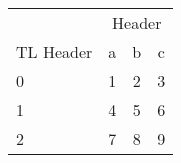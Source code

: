 \begin{table}
\centering
\begin{threeparttable}
\caption{}
\begin{tabular}{lccc}
\toprule
 & \multicolumn{3}{c}{Header}\\
\cmidrule(lr){2-4}
TL Header & a & b & c\\
\midrule
0 & 1 & 2 & 3 \\
1 & 4 & 5 & 6 \\
2 & 7 & 8 & 9 \\
\bottomrule

\end{tabular}
\end{threeparttable}
\end{table}